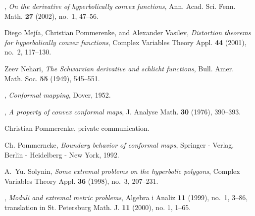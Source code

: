 \documentclass{lms}
\numberwithin{equation}{section}
\begin{document}
\begin{thebibliography}{10000}
\bysame, \emph{On the derivative of hyperbolically convex functions}, Ann.
  Acad. Sci. Fenn. Math. \textbf{27} (2002), no.~1, 47--56.

Diego Mej\'ia, Christian Pommerenke, and Alexander Vasil{\cprime}ev,
  \emph{Distortion theorems for hyperbolically convex functions}, Complex
  Variables Theory Appl. \textbf{44} (2001), no.~2, 117--130. 

Zeev Nehari, \emph{The {S}chwarzian derivative and schlicht functions}, Bull.
  Amer. Math. Soc. \textbf{55} (1949), 545--551. 

\bysame, \emph{Conformal mapping}, Dover, 1952.

\bysame, \emph{A property of convex conformal maps}, J. Analyse Math.
  \textbf{30} (1976), 390--393. 

Christian Pommerenke, private communication.

Ch. Pommerneke, \emph{Boundary behavior of conformal maps}, Springer - Verlag,
  Berlin - Heidelberg - New York, 1992.

A.~Yu. Solynin, \emph{Some extremal problems on the hyperbolic polygons},
  Complex Variables Theory Appl. \textbf{36} (1998), no.~3, 207--231.

\bysame, \emph{Moduli and extremal metric problems}, Algebra i Analiz
  \textbf{11} (1999), no.~1, 3--86, translation in St. Petersburg Math. J.
  \textbf{11} (2000), no. 1, 1--65. 

\end{thebibliography}



\affiliationtwo{%
   Leah Cole\\
   Department of Mathematics, Wayland Baptist University, 
 Plainview, Texas  79072\\United States
   \email{colel@wbu.edu}}
\end{document}
